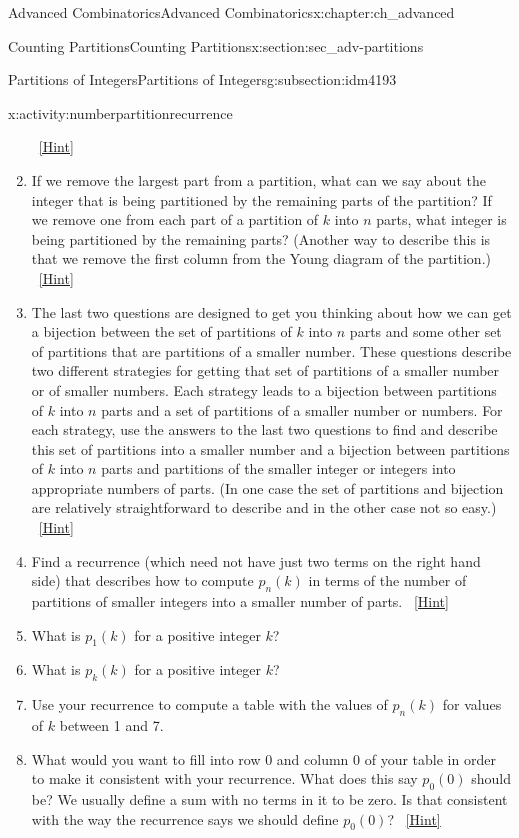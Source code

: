 \documentclass[oneside,10pt,]{book}
\numberwithin{equation}{chapter}
\begin{document}
\begin{chapterptx}{Advanced Combinatorics}{}{Advanced Combinatorics}{}{}{x:chapter:ch_advanced}
\begin{sectionptx}{Counting Partitions}{}{Counting Partitions}{}{}{x:section:sec_adv-partitions}
\begin{subsectionptx}{Partitions of Integers}{}{Partitions of Integers}{}{}{g:subsection:idm4193}
\begin{activity}{}{x:activity:numberpartitionrecurrence}
\begin{enumerate}[font=\bfseries,label=(\alph*),ref=\alph*]
\qquad~\hfill{\tiny\hyperlink{g:hint:idm4406-back}{[Hint]}}\item{}If we remove the largest part from a partition, what can we say about the integer that is being partitioned by the remaining parts of the partition? If we remove one from each part of a partition of \(k\) into \(n\) parts, what integer is being partitioned by the remaining parts? (Another way to describe this is that we remove the first column from the Young diagram of the partition.)%
\qquad~\hfill{\tiny\hyperlink{g:hint:idm4415-back}{[Hint]}}\item{}The last two questions are designed to get you thinking about how we can get a bijection between the set of partitions of \(k\) into \(n\) parts and some other set of partitions that are partitions of a smaller number.  These questions describe two different strategies for getting that set of partitions of a smaller number or of smaller numbers.  Each strategy leads to a bijection between partitions of \(k\) into \(n\) parts and a set of partitions of a smaller number or numbers.  For each strategy, use the answers to the last two questions to find and describe this set of partitions into a smaller number and a bijection between partitions of \(k\) into \(n\) parts and partitions of the smaller integer or integers into appropriate numbers of parts. (In one case the set of partitions and bijection are relatively straightforward to describe and in the other case not so easy.)%
\qquad~\hfill{\tiny\hyperlink{g:hint:idm4432-back}{[Hint]}}\item{}Find a recurrence (which need not have just two terms on the right hand side) that describes how to compute \(p_n(k)\) in terms of the number of partitions of smaller integers into a smaller number of parts.%
\qquad~\hfill{\tiny\hyperlink{g:hint:idm4464-back}{[Hint]}}\item{}What is \(p_1(k)\) for a positive integer \(k\)?%
\item{}What is \(p_k(k)\) for a positive integer \(k\)?%
\item{}Use your recurrence to compute a table with the values of \(p_n(k)\) for values of \(k\) between 1 and 7.%
\item{}What would you want to fill into row 0 and column 0 of your table in order to make it consistent with your recurrence.  What does this say \(p_0(0)\) should be?  We usually define a sum with no terms in it to be zero. Is that consistent with the way the recurrence says we should define \(p_0(0)\)?%
\qquad~\hfill{\tiny\hyperlink{g:hint:idm4578-back}{[Hint]}}\end{enumerate}

\end{activity}
\end{subsectionptx}
\end{sectionptx}
\end{chapterptx}
\end{document}
